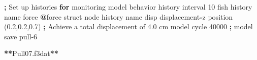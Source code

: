 \documentclass[a4paper, nobind]{templates/ociamthesis}
\newenvironment{Shaded}{\begin{snugshade}}{\end{snugshade}}
\newcommand{\ControlFlowTok}[1]{\textcolor[rgb]{0.13,0.29,0.53}{\textbf{#1}}}
\newcommand{\DecValTok}[1]{\textcolor[rgb]{0.00,0.00,0.81}{#1}}
\newcommand{\FloatTok}[1]{\textcolor[rgb]{0.00,0.00,0.81}{#1}}
\newcommand{\NormalTok}[1]{#1}
\newcommand{\OperatorTok}[1]{\textcolor[rgb]{0.81,0.36,0.00}{\textbf{#1}}}
\newcommand{\StringTok}[1]{\textcolor[rgb]{0.31,0.60,0.02}{#1}}
\renewenvironment{Shaded}
{
  \vspace{10pt}%
  \begin{snugshade}%
}{%
  \end{snugshade}%
  \vspace{8pt}%
}
\begin{document}
\begin{Shaded}
\begin{Highlighting}[]
    \OperatorTok{;}\NormalTok{ Set up histories }\ControlFlowTok{for}\NormalTok{ monitoring model behavior}
\NormalTok{    history interval }\DecValTok{10}
\NormalTok{    fish history name }\StringTok{\textquotesingle{}force\textquotesingle{}} \OperatorTok{@}\NormalTok{force}
\NormalTok{    struct node history name }\StringTok{\textquotesingle{}disp\textquotesingle{}}\NormalTok{ displacement}\OperatorTok{{-}}\NormalTok{z position (}\FloatTok{0.2}\NormalTok{,}\FloatTok{0.2}\NormalTok{,}\FloatTok{0.7}\NormalTok{)}
    \OperatorTok{;}\NormalTok{ Achieve a total displacement of }\FloatTok{4.0}\NormalTok{ cm}
\NormalTok{    model cycle }\DecValTok{40000}
    \OperatorTok{;}
\NormalTok{    model save }\StringTok{\textquotesingle{}pull{-}6\textquotesingle{}}

\OperatorTok{**}\NormalTok{Pull07.f3dat}\OperatorTok{**}


\end{Highlighting}
\end{Shaded}
\end{document}
